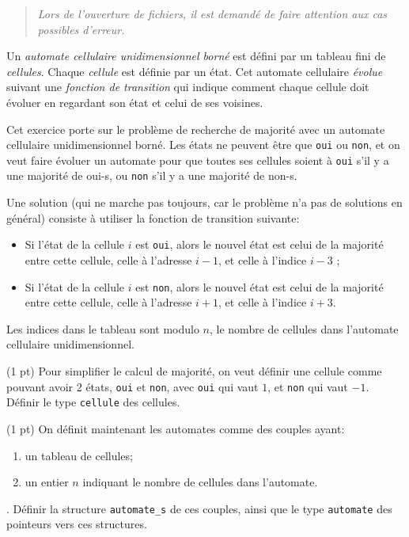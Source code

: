 
\begin{quotation}
  \sl Lors de l'ouverture de fichiers, il est demandé de faire
  attention aux cas possibles d'erreur.
\end{quotation}

  Un \emph{automate cellulaire unidimensionnel born{\'e}} est
  d{\'e}fini par un tableau fini de \emph{cellules}. Chaque \emph{cellule}
  est d{\'e}finie par un {\'e}tat. Cet automate cellulaire \emph{{\'e}volue} suivant une
  \emph{fonction de transition} qui indique comment chaque cellule doit 
  {\'e}voluer en regardant son {\'e}tat et celui de ses voisines.

  Cet exercice porte sur le probl{\`e}me de recherche de majorit{\'e} avec un
  automate cellulaire unidimensionnel born{\'e}. Les {\'e}tats ne peuvent
  {\^e}tre que \texttt{oui} ou \texttt{non}, et on veut faire {\'e}voluer un
  automate pour que toutes ses cellules soient {\`a} \texttt{oui} s'il y a
  une majorit{\'e} de oui-s, ou \texttt{non} s'il y a une majorit{\'e} de non-s.

  Une solution (qui ne marche pas toujours, car le probl{\`e}me n'a pas de
  solutions en g{\'e}n{\'e}ral) consiste {\`a} utiliser la fonction de transition
  suivante:
  \begin{itemize}
  \item Si l'{\'e}tat de la cellule $i$ est \texttt{oui}, alors le nouvel 
  {\'e}tat est celui de la majorit{\'e} entre cette cellule, celle {\`a} 
  l'adresse $i-1$, et celle {\`a} l'indice $i-3$ ;
  \item Si l'{\'e}tat de la cellule $i$ est \texttt{non}, alors le nouvel 
  {\'e}tat est celui de la majorit{\'e} entre cette cellule, celle {\`a} 
  l'adresse $i+1$, et celle {\`a} l'indice $i+3$.
  \end{itemize}
  Les indices dans le tableau sont modulo $n$, le nombre de cellules 
  dans l'automate cellulaire unidimensionnel.

\vspace*{1em}

\question (1 pt) Pour simplifier le calcul de majorit{\'e}, on veut d{\'e}finir
une cellule comme pouvant avoir 2 {\'e}tats, \texttt{oui} et
\texttt{non}, avec \texttt{oui} qui vaut $1$, et \texttt{non} qui vaut
$-1$. D{\'e}finir le type \texttt{cellule} des cellules.


\question (1 pt) On d{\'e}finit maintenant les automates comme des couples ayant:
\begin{enumerate}
\item un tableau de cellules;
\item un entier $n$ indiquant le nombre de cellules dans l'automate.
\end{enumerate}.
D{\'e}finir la structure \texttt{automate\_s} de ces couples, ainsi que le type 
\texttt{automate} des pointeurs vers ces structures.


